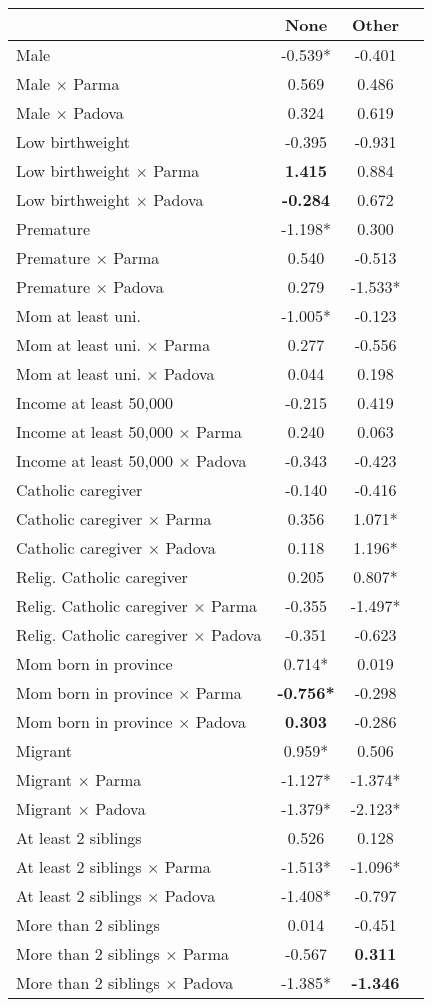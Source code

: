 \begin{tabular}{l c c c}
\toprule
& None & Other \\
\midrule
Male & -0.539* &    -0.401 \\
Male $\times$ Parma &     0.569 &     0.486 \\
Male $\times$ Padova &     0.324 &     0.619 \\
Low birthweight &    -0.395 &    -0.931 \\
Low birthweight $\times$ Parma & \textbf{    1.415} &     0.884 \\
Low birthweight $\times$ Padova & \textbf{   -0.284} &     0.672 \\
Premature & -1.198* &     0.300 \\
Premature $\times$ Parma &     0.540 &    -0.513 \\
Premature $\times$ Padova &     0.279 & -1.533* \\
Mom at least uni. & -1.005* &    -0.123 \\
Mom at least uni. $\times$ Parma &     0.277 &    -0.556 \\
Mom at least uni. $\times$ Padova &     0.044 &     0.198 \\
Income at least 50,000 &    -0.215 &     0.419 \\
Income at least 50,000 $\times$ Parma &     0.240 &     0.063 \\
Income at least 50,000 $\times$ Padova &    -0.343 &    -0.423 \\
Catholic caregiver &    -0.140 &    -0.416 \\
Catholic caregiver $\times$ Parma &     0.356 & 1.071* \\
Catholic caregiver $\times$ Padova &     0.118 & 1.196* \\
Relig. Catholic caregiver &     0.205 & 0.807* \\
Relig. Catholic caregiver $\times$ Parma &    -0.355 & -1.497* \\
Relig. Catholic caregiver $\times$ Padova &    -0.351 &    -0.623 \\
Mom born in province & 0.714* &     0.019 \\
Mom born in province $\times$ Parma & \textbf{-0.756*} &    -0.298 \\
Mom born in province $\times$ Padova & \textbf{    0.303} &    -0.286 \\
Migrant & 0.959* &     0.506 \\
Migrant $\times$ Parma & -1.127* & -1.374* \\
Migrant $\times$ Padova & -1.379* & -2.123* \\
At least 2 siblings &     0.526 &     0.128 \\
At least 2 siblings $\times$ Parma & -1.513* & -1.096* \\
At least 2 siblings $\times$ Padova & -1.408* &    -0.797 \\
More than 2 siblings &     0.014 &    -0.451 \\
More than 2 siblings $\times$ Parma &    -0.567 & \textbf{    0.311} \\
More than 2 siblings $\times$ Padova & -1.385* & \textbf{   -1.346} \\
\bottomrule
\end{tabular}
